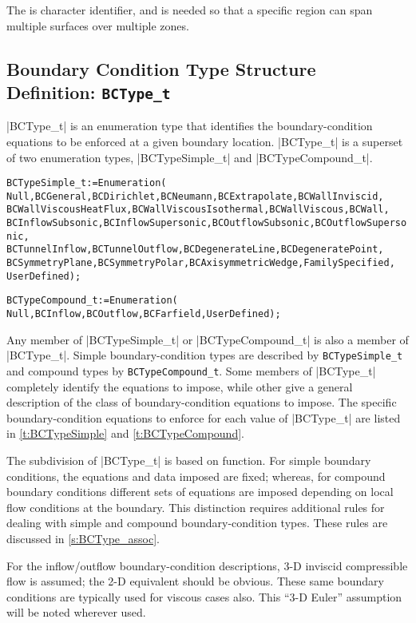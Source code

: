 The  is character identifier, and is needed so that a
specific region can span multiple surfaces over multiple zones.

\subsection{Boundary Condition Type Structure Definition: \texttt{BCType\_t}} 
\label{s:BCType}

|BCType_t| is an enumeration type that identifies the boundary-condition
equations to be enforced at a given boundary location.
|BCType_t| is a superset of two enumeration types, |BCTypeSimple_t|
and |BCTypeCompound_t|.
\begin{alltt}
  BCTypeSimple\_t := Enumeration(
    Null, BCGeneral, BCDirichlet, BCNeumann, BCExtrapolate, BCWallInviscid, 
    BCWallViscousHeatFlux, BCWallViscousIsothermal, BCWallViscous, BCWall,
    BCInflowSubsonic, BCInflowSupersonic, BCOutflowSubsonic, BCOutflowSupersonic,
    BCTunnelInflow, BCTunnelOutflow, BCDegenerateLine, BCDegeneratePoint,
    BCSymmetryPlane, BCSymmetryPolar, BCAxisymmetricWedge, FamilySpecified,
    UserDefined ) ;
\end{alltt}

\begin{alltt}
  BCTypeCompound\_t := Enumeration( 
    Null, BCInflow, BCOutflow, BCFarfield, UserDefined ) ;
\end{alltt}

Any member of |BCTypeSimple_t| or |BCTypeCompound_t| is also a member
of |BCType_t|.
Simple boundary-condition types are described by \texttt{BCTypeSimple\_t}
and compound types by \texttt{BCTypeCompound\_t}.
Some members of |BCType_t| completely identify the equations to
impose, while other give a general description of the class of
boundary-condition equations to impose.
The specific boundary-condition equations to enforce for each value
of |BCType_t| are listed in \autoref{t:BCTypeSimple} and
\autoref{t:BCTypeCompound}.

The subdivision of |BCType_t| is based on function.  For simple
boundary conditions, the equations and data imposed are fixed; whereas,
for compound boundary conditions different sets of equations are
imposed depending on local flow conditions at the boundary.  This
distinction requires additional rules for dealing with simple and
compound boundary-condition types.  These rules are discussed in
\autoref{s:BCType_assoc}.

For the inflow/outflow boundary-condition descriptions, 3-D inviscid
compressible flow is assumed; the 2-D equivalent should be obvious.
These same boundary conditions are typically used for viscous cases
also.  This ``3-D Euler'' assumption will be noted wherever used.

